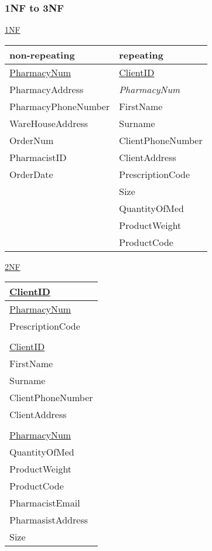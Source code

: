 \subsubsection{1NF to 3NF}
\underline{1NF}
\begin{table}[H]
\begin{tabular}{|l|l|}
\hline
\textbf{non-repeating} & \textbf{repeating} \\
\hline
\underline{PharmacyNum}&\underline{ClientID}\\\hline
 PharmacyAddress       & \emph{PharmacyNum} \\\hline
 PharmacyPhoneNumber   & FirstName          \\\hline
 WareHouseAddress      & Surname            \\\hline
 OrderNum              & ClientPhoneNumber  \\\hline
 PharmacistID          & ClientAddress      \\\hline
 OrderDate             & PrescriptionCode   \\\hline
 							  & Size               \\\hline
						     & QuantityOfMed      \\\hline
                       & ProductWeight      \\\hline
                       & ProductCode        \\
\hline
\end{tabular}
\end{table}

\underline{2NF}
\begin{table}[H]
\begin{tabular}{|l|}
\hline
\underline{ClientID}   \\\hline
\underline{PharmacyNum}\\\hline
PrescriptionCode       \\\hline
\\\hline
\underline{ClientID}   \\\hline
FirstName              \\\hline
Surname                \\\hline
ClientPhoneNumber      \\\hline
ClientAddress          \\\hline
\\\hline
\underline{PharmacyNum}\\\hline
QuantityOfMed          \\\hline
ProductWeight          \\\hline
ProductCode            \\\hline
PharmacistEmail        \\\hline
PharmasistAddress      \\\hline
Size                         \\
\hline
\end{tabular}
\end{table}


